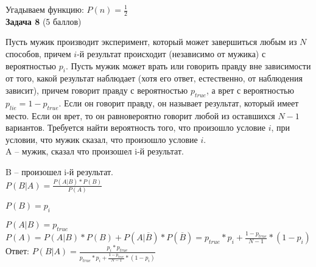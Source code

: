 \documentclass{article}
\begin{document}
Угадываем функцию: $P(n) = \frac{1}{2}$\\

\textbf{Задача 8} (5 баллов)

Пусть мужик производит эксперимент, который может завершиться любым из $N$ способов, причем $i$-й результат происходит (независимо от мужика) с вероятностью  $p_i$. Пусть мужик может врать или говорить правду вне зависимости от того, какой результат наблюдает (хотя его ответ, естественно, от наблюдения зависит), причем говорит правду с вероятностью  $p_{true}$, а врет с вероятностью $p_{lie} = 1 - p_{true}$. Если он говорит правду, он называет результат, который имеет место. Если он врет, то он равновероятно говорит любой из оставшихся $N-1$  вариантов. Требуется найти вероятность того, что произошло условие $i$, при условии, что мужик сказал, что произошло условие $i$.\\

A -- мужик, сказал что произошел i-й результат.

B --  произошел i-й результат.\\

$P(B\vert A) = \frac{P(A\vert B)*P(B)}{P(A)}$

$P(B) = p_i$ 

$P(A\vert B) = p_{true}$\\

$P(A) = P(A\vert B)*P(B) + P(A\vert \overline{B})*P(\overline{B}) = p_{true}*p_i + \frac{1 - p_{true}}{N-1}*(1 - p_i)$\\

Ответ: $P(B\vert A) = \frac{p_i*p_{true}}{p_{true}*p_i + \frac{1 - p_{true}}{N-1}*(1 - p_i)}$
\end{document}
